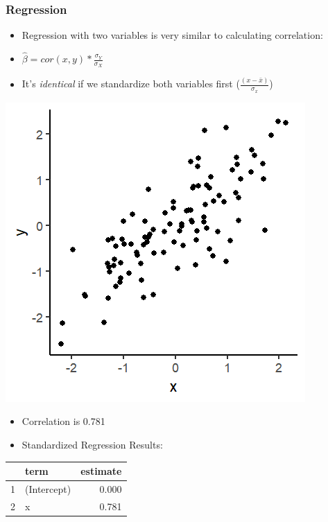 \documentclass[xcolor=x11names,compress]{beamer}\usepackage[]{graphicx}\usepackage[]{color}
\makeatletter
\def\maxwidth{ %
  \ifdim\Gin@nat@width>\linewidth
    \linewidth
  \else
    \Gin@nat@width
  \fi
}
\newenvironment{knitrout}{}{} %
\renewcommand{\(}{\begin{columns}}
\renewcommand{\)}{\end{columns}}
\newcommand{\<}[1]{\begin{column}{#1}}
\renewcommand{\>}{\end{column}}
\makeatother
\begin{document}
\begin{frame}
\frametitle{Regression}
\begin{itemize}
\item Regression with two variables is very similar to calculating correlation:
\item $\hat{\beta}=cor(x,y) * \frac{\sigma_Y}{\sigma_X}$
\item It's \textit{identical} if we standardize both variables first ($\frac{(x-\bar{x})}{\sigma_x}$)
\end{itemize}
\begin{multicols}{2}
\begin{knitrout}
\color{fgcolor}
\includegraphics[width=\maxwidth]{figure/corr_regn_fig3-1} 

\end{knitrout}
\columnbreak
\begin{itemize}
\item Correlation is 0.781
\item Standardized Regression Results:
\end{itemize}
\begin{table}[ht]
\centering
\begin{tabular}{rlr}
  \hline
 & term & estimate \\ 
  \hline
1 & (Intercept) & 0.000 \\ 
  2 & x & 0.781 \\ 
   \hline
\end{tabular}
\end{table}

\end{multicols}
\end{frame}
\end{document}

